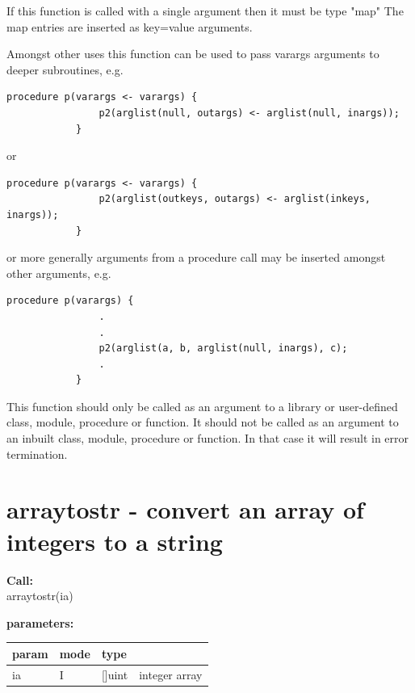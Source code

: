         If this function is called with a single argument then it must be type "map"
        The map entries are inserted as key=value arguments.
        
        Amongst other uses this function can be used to pass varargs arguments to
        deeper subroutines, e.g.
        
        \begin{lstlisting}[gobble=12, language=threepl]
            procedure p(varargs <- varargs) {
                p2(arglist(null, outargs) <- arglist(null, inargs));
            }
        \end{lstlisting}
        
        or
        
        \begin{lstlisting}[gobble=12, language=threepl]
            procedure p(varargs <- varargs) {
                p2(arglist(outkeys, outargs) <- arglist(inkeys, inargs));
            }
        \end{lstlisting}
        
        or more generally arguments from a procedure call may be inserted
        amongst other arguments, e.g.

        
        \begin{lstlisting}[gobble=12, language=threepl]
            procedure p(varargs) {
                .
                .
                p2(arglist(a, b, arglist(null, inargs), c);
                .
            }
        \end{lstlisting}
        
        
        This function should only be called as an argument to a library or
        user-defined class, module, procedure or function. It should not be
        called as an argument to an inbuilt class, module, procedure or
        function. In that case it will result in error termination.


    \section{arraytostr - convert an array of integers to a string}\label{sec:ifarraytostr}
        
        {\bf Call:} \\
        arraytostr(ia)
        
        {\bf parameters:} \\
        \begin{tabular}{| l | l | l | l |}
        \hline
        param  & mode & type & \\
        \hline \hline
        ia & I & []uint & integer array   \\ \hline
        \end{tabular}
        
